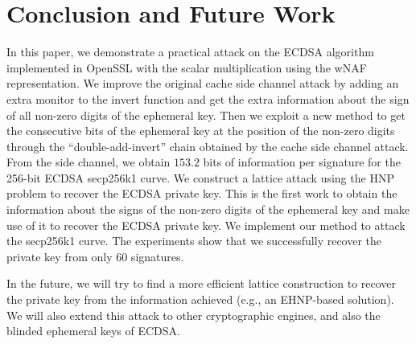 \section{Conclusion and Future Work}
\label{sec:conclusion}
In this paper, we demonstrate a practical attack on the ECDSA algorithm implemented in OpenSSL with the scalar multiplication using the wNAF representation.
We improve the original cache side channel attack
 by adding an extra monitor to the invert function and get the extra information about the sign of all non-zero digits of the ephemeral key.
Then we exploit a new method to get the consecutive bits of the ephemeral key at the position of the non-zero digits through the ``double-add-invert'' chain obtained by the cache side channel attack.
From the side channel, we obtain $153.2$ bits of information per signature for the 256-bit ECDSA secp256k1 curve.
We construct a lattice attack using the HNP problem to recover the ECDSA private key.
This is the first work to obtain the information about the signs of the non-zero digits of the ephemeral key and make use of it to recover the ECDSA private key.
We implement our method to attack the secp256k1 curve.
The experiments show that we successfully recover the private key from only $60$ signatures.

In the future,
 we will try to find a more efficient lattice construction to recover the private key
    from the information achieved (e.g., an EHNP-based solution).
We will also extend this attack to other cryptographic engines,
    and also the blinded ephemeral keys of ECDSA.


